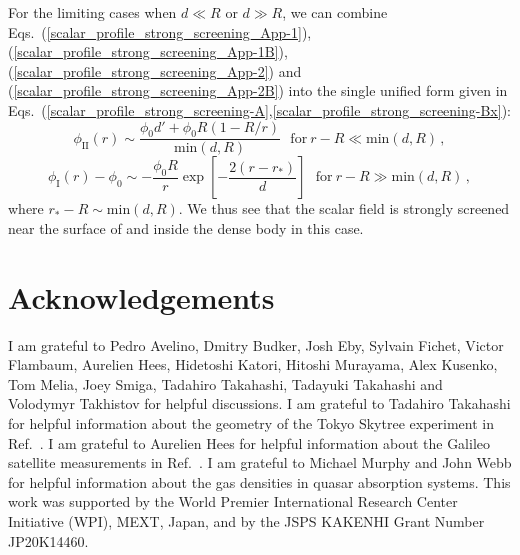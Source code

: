 \documentclass[aps,prd,onecolumn,nofootinbib]{revtex4-2} %
\begin{document}
For the limiting cases when $d \ll R$ or $d \gg R$, we can combine Eqs.~(\ref{scalar_profile_strong_screening_App-1}), (\ref{scalar_profile_strong_screening_App-1B}), (\ref{scalar_profile_strong_screening_App-2}) and (\ref{scalar_profile_strong_screening_App-2B}) into the single unified form given in Eqs.~(\ref{scalar_profile_strong_screening-A},\ref{scalar_profile_strong_screening-Bx}): 
\begin{equation}
\label{scalar_profile_strong_screening-App-3}
\phi_\textrm{II}(r) \sim \frac{\phi_0 d' + \phi_0 R (1 - R/r)}{\textrm{min} \left( d , R \right)}  ~~~\textrm{for} ~ r - R \ll \textrm{min} \left( d , R \right)  \, , 
\end{equation}
\begin{equation}
\label{scalar_profile_strong_screening-App-3B}
\phi_\textrm{I}(r) - \phi_0 \sim - \frac{\phi_0 R}{r} \exp \left[ -\frac{2 \left( r - r_* \right)}{d} \right]  ~~~\textrm{for} ~ r - R \gg \textrm{min} \left( d , R \right)  \, , 
\end{equation}
where $r_* - R \sim \textrm{min} (d,R)$. 
We thus see that the scalar field is strongly screened near the surface of and inside the dense body in this case. 



\vspace{200mm}




\section*{Acknowledgements}
I am grateful to Pedro Avelino, Dmitry Budker, Josh Eby, Sylvain Fichet, Victor Flambaum, Aurelien Hees, Hidetoshi Katori, Hitoshi Murayama, Alex Kusenko, Tom Melia, Joey Smiga, Tadahiro Takahashi, Tadayuki Takahashi and Volodymyr Takhistov for helpful discussions. 
I am grateful to Tadahiro Takahashi for helpful information about the geometry of the Tokyo Skytree experiment in Ref.~\cite{TokyoSkytree_2020}. 
I am grateful to Aurelien Hees for helpful information about the Galileo satellite measurements in Ref.~\cite{Eccentric_Galileo_2018A}. 
I am grateful to Michael Murphy and John Webb for helpful information about the gas densities in quasar absorption systems. 
This work was supported by the World Premier International Research Center Initiative (WPI), MEXT, Japan, and by the JSPS KAKENHI Grant Number JP20K14460. 
\end{document}
